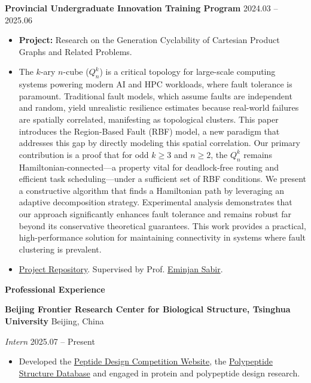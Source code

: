 \documentclass[11pt]{article}
\begin{document}
	\vspace{10pt}

	\textbf{Provincial Undergraduate Innovation Training Program} \hfill 2024.03 – 2025.06
	\begin{itemize}[noitemsep, topsep=0pt, partopsep=0pt, parsep=0pt, leftmargin=*]
		\item \textbf{Project:} Research on the Generation Cyclability of Cartesian Product Graphs and Related Problems.
		\item {\small The $k$-ary $n$-cube ($Q_n^k$) is a critical topology for large-scale computing systems powering modern AI and HPC workloads, where fault tolerance is paramount. Traditional fault models, which assume faults are independent and random, yield unrealistic resilience estimates because real-world failures are spatially correlated, manifesting as topological clusters. This paper introduces the Region-Based Fault (RBF) model, a new paradigm that addresses this gap by directly modeling this spatial correlation. Our primary contribution is a proof that for odd $k \geq 3$ and $n \geq 2$, the $Q_n^k$ remains Hamiltonian-connected—a property vital for deadlock-free routing and efficient task scheduling—under a sufficient set of RBF conditions. We present a constructive algorithm that finds a Hamiltonian path by leveraging an adaptive decomposition strategy. Experimental analysis demonstrates that our approach significantly enhances fault tolerance and remains robust far beyond its conservative theoretical guarantees. This work provides a practical, high-performance solution for maintaining connectivity in systems where fault clustering is prevalent.}
		\item \href{https://github.com/wyqmath/Hamiltonian_Path}{Project Repository}. Supervised by Prof. \href{https://orcid.org/0000-0003-1456-4539}{Eminjan Sabir}.
	\end{itemize}
	
	\vspace{12pt}
	
	\begin{center}
		\textbf{\large Professional Experience}
	\end{center}
	\textbf{Beijing Frontier Research Center for Biological Structure, Tsinghua University} \hfill Beijing, China
	
	\textit{Intern} \hfill 2025.07 – Present
	\begin{itemize}[noitemsep, topsep=0pt, partopsep=0pt, parsep=0pt, leftmargin=*]
		\item Developed the \href{https://www.fbs.frcbs.tsinghua.edu.cn/competition/2025Peptide/}{Peptide Design Competition Website}, the \href{https://www.frcbs.tsinghua.edu.cn/cpdb/}{Polypeptide Structure Database} and engaged in protein and polypeptide design research.
	\end{itemize}
	
\end{document}
